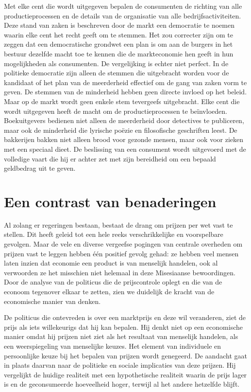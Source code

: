 \begin{blockquotebox}
    Met elke cent die wordt uitgegeven bepalen de consumenten de richting van alle productieprocessen en de details van de organisatie van alle bedrijfsactiviteiten. Deze stand van zaken is beschreven door de markt een democratie te noemen waarin elke cent het recht geeft om te stemmen. Het zou correcter zijn om te zeggen dat een democratische grondwet een plan is om aan de burgers in het bestuur dezelfde macht toe te kennen die de markteconomie hen geeft in hun mogelijkheden als consumenten. De vergelijking is echter niet perfect. In de politieke democratie zijn alleen de stemmen die uitgebracht worden voor de kandidaat of het plan van de meerderheid effectief om de gang van zaken vorm te geven. De stemmen van de minderheid hebben geen directe invloed op het beleid. Maar op de markt wordt geen enkele stem tevergeefs uitgebracht. Elke cent die wordt uitgegeven heeft de macht om de productieprocessen te beïnvloeden. Boekuitgevers bedienen niet alleen de meerderheid door detectives te publiceren, maar ook de minderheid die lyrische poëzie en filosofische geschriften leest. De bakkerijen bakken niet alleen brood voor gezonde mensen, maar ook voor zieken met een speciaal dieet. De beslissing van een consument wordt uitgevoerd met de volledige vaart die hij er achter zet met zijn bereidheid om een bepaald geldbedrag uit te geven.\footnotemark    
\end{blockquotebox}
\autocite{128}

\hypertarget{een-contrast-van-benaderingen}{%
\section{Een contrast van benaderingen}\label{een-contrast-van-benaderingen}}

Al zolang er regeringen bestaan, bestaat de drang om prijzen per wet vast te stellen. Dit heeft geleid tot een hele reeks verschrikkelijke en voorspelbare gevolgen.\autocite{129} Maar de vele en diverse vergeefse pogingen van centrale overheden om prijzen vast te leggen hebben één positief gevolg gehad: ze hebben veel mensen laten inzien dat economie een product is van menselijk handelen, ook al verwoorden ze het misschien niet helemaal in deze Misesiaanse bewoordingen. Door de analyse van de politicus die de prijscontrole oplegt en die van de econoom tegenover elkaar te zetten, zien we duidelijk de kracht van de economische manier van denken.

De politicus die ontevreden is over een marktprijs en deze wil veranderen, ziet de prijs als iets willekeurigs dat hij kan bepalen. Hij denkt niet op een economische manier omdat hij prijzen niet ziet als het resultaat van menselijk handelen, als een weerspiegeling van menselijke keuzes. Het element van individuele en persoonlijke keuze bij het bepalen van prijzen wordt genegeerd. De aandacht gaat in plaats daarvan naar de politieke en sociale implicaties van deze prijzen. Hij vergelijkt de huidige realiteit met een hypothetische realiteit waarin de prijs lager is en de geconsumeerde hoeveelheid hoger, terwijl al het andere hetzelfde blijft.

